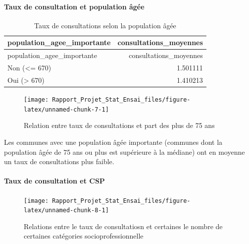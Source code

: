 \documentclass[
]{article}
\begin{document}
\hypertarget{taux-de-consultation-et-population-uxe2guxe9e}{%
\paragraph{Taux de consultation et population
âgée}\label{taux-de-consultation-et-population-uxe2guxe9e}}

\begin{longtable}[]{@{}lr@{}}
\caption{Taux de consultations selon la population âgée}\tabularnewline
\toprule\noalign{}
population\_agee\_importante & consultations\_moyennes \\
\midrule\noalign{}
\endfirsthead
\toprule\noalign{}
population\_agee\_importante & consultations\_moyennes \\
\midrule\noalign{}
\endhead
\bottomrule\noalign{}
\endlastfoot
Non (\textless= 670) & 1.501111 \\
Oui (\textgreater{} 670) & 1.410213 \\
\end{longtable}

\begin{figure}

{\centering \texttt{[image: Rapport\_Projet\_Stat\_Ensai\_files/figure-latex/unnamed-chunk-7-1]} 

}

\caption{Relation entre taux de consultations et part des plus de 75 ans}\label{fig:unnamed-chunk-7}
\end{figure}

Les communes avec une population âgée importante (communes dont la
population âgée de 75 ans ou plus est supérieure à la médiane) ont en
moyenne un taux de consultations plus faible.

\hypertarget{taux-de-consultation-et-csp}{%
\paragraph{Taux de consultation et
CSP}\label{taux-de-consultation-et-csp}}

\begin{figure}

{\centering \texttt{[image: Rapport\_Projet\_Stat\_Ensai\_files/figure-latex/unnamed-chunk-8-1]} 

}

\caption{Relations entre le taux de consultatiosn et certaines le nombre de certaines catégories socioprofessionnelle}\label{fig:unnamed-chunk-8}
\end{figure}
\end{document}
